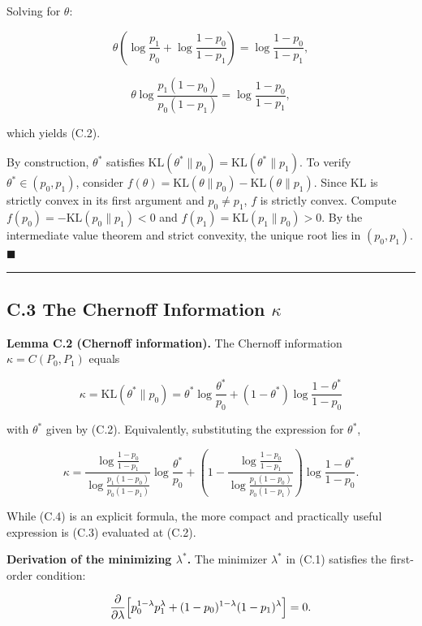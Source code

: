 \documentclass[
  12pt,
]{ctexart}
\begin{document}
Solving for \(\theta\):

\[
\theta\left(\log\frac{p_1}{p_0} + \log\frac{1-p_0}{1-p_1}\right) = \log\frac{1-p_0}{1-p_1},
\]

\[
\theta \log\frac{p_1(1-p_0)}{p_0(1-p_1)} = \log\frac{1-p_0}{1-p_1},
\]

which yields (C.2).

By construction, \(\theta^*\) satisfies
\(\text{KL}(\theta^*\|p_0) = \text{KL}(\theta^*\|p_1)\). To verify
\(\theta^* \in (p_0,p_1)\), consider
\(f(\theta) = \text{KL}(\theta\|p_0) - \text{KL}(\theta\|p_1)\). Since
KL is strictly convex in its first argument and \(p_0 \neq p_1\), \(f\)
is strictly convex. Compute \(f(p_0) = -\text{KL}(p_0\|p_1) < 0\) and
\(f(p_1) = \text{KL}(p_1\|p_0) > 0\). By the intermediate value theorem
and strict convexity, the unique root lies in \((p_0,p_1)\).
\(\blacksquare\)

\begin{center}\rule{0.5\linewidth}{0.5pt}\end{center}

\subsection{\texorpdfstring{C.3 The Chernoff Information
\(\kappa\)}{C.3 The Chernoff Information \textbackslash kappa}}\label{c.3-the-chernoff-information-kappa}

\textbf{Lemma C.2 (Chernoff information).} The Chernoff information
\(\kappa = C(P_0,P_1)\) equals

\[
\boxed{\;
\kappa = \text{KL}(\theta^*\|p_0)
= \theta^*\log\frac{\theta^*}{p_0} + (1-\theta^*)\log\frac{1-\theta^*}{1-p_0}
\;} \tag{C.3}
\]

with \(\theta^*\) given by (C.2). Equivalently, substituting the
expression for \(\theta^*\),

\[
\kappa = \frac{\log\frac{1-p_0}{1-p_1}}{\log\frac{p_1(1-p_0)}{p_0(1-p_1)}}
        \log\frac{\theta^*}{p_0}
        + \left(1 - \frac{\log\frac{1-p_0}{1-p_1}}{\log\frac{p_1(1-p_0)}{p_0(1-p_1)}}\right)
        \log\frac{1-\theta^*}{1-p_0}. \tag{C.4}
\]

While (C.4) is an explicit formula, the more compact and practically
useful expression is (C.3) evaluated at (C.2).

\textbf{Derivation of the minimizing \(\lambda^*\).} The minimizer
\(\lambda^*\) in (C.1) satisfies the first-order condition:

\[
\frac{\partial}{\partial\lambda}\Bigl[p_0^{1-\lambda}p_1^\lambda + (1-p_0)^{1-\lambda}(1-p_1)^\lambda\Bigr] = 0.
\]
\end{document}
